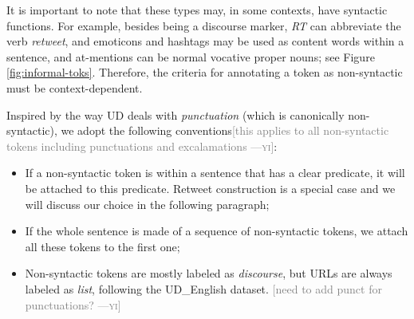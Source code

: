 \documentclass[11pt,a4paper]{article}
\newcommand{\yjcomment}[1]{\textcolor{orange}{[$_\mathrm{L}^\mathrm{Y}$#1]}}
\newcommand{\nascomment}[1]{\textcolor{blue}{[#1 ---\textsc{nas}]}}
\newcommand{\yicomment}[1]{\textcolor{gray}{[#1 ---\textsc{yi}]}}
\begin{document}
It is important to note that these types may, in some
contexts, have syntactic functions.
For example, besides being a discourse marker, \emph{RT} can
abbreviate the verb {\it retweet}, and emoticons and hashtags may be
used as content words within a sentence, and at-mentions can be normal vocative proper nouns; see Figure
\ref{fig:informal-toks}.  Therefore, the criteria for annotating a
token as non-syntactic must be context-dependent.


Inspired by the way UD deals with \emph{punctuation} (which is
canonically non-syntactic), we adopt the following
conventions\yicomment{this applies to all non-syntactic tokens including punctuations and excalamations}:

\begin{itemize}
\item If a non-syntactic token is within a sentence that has a clear predicate, it will be attached to this predicate. Retweet construction is a special case and we will discuss our choice in the following paragraph;
\item If the whole sentence is made of a sequence of non-syntactic tokens, we attach all these tokens to the first one;
\item Non-syntactic tokens are mostly labeled as {\it discourse}, but
  URLs are always labeled as {\it list}, following the UD\_English dataset. \yicomment{need to add punct for punctuations?}
\end{itemize}
\end{document}
